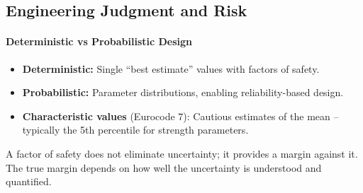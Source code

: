 \subsection{Engineering Judgment and Risk}

\paragraph{Deterministic vs Probabilistic Design}
\begin{itemize}
 \item \textbf{Deterministic:} Single ``best estimate'' values with factors of safety.
 \item \textbf{Probabilistic:} Parameter distributions, enabling reliability-based design.
 \item \textbf{Characteristic values} (Eurocode 7): Cautious estimates of the mean -- typically the 5th percentile for strength parameters.
\end{itemize}

\begin{notebox}
A factor of safety does not eliminate uncertainty; it provides a margin against it. The true margin depends on how well the uncertainty is understood and quantified.
\end{notebox}
